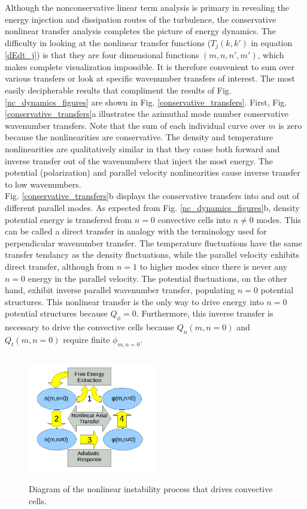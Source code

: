 \documentclass[12pt]{article}
\begin{document}
Although the nonconservative linear term analysis is primary in revealing the energy injection and dissipation routes of the turbulence, the conservative nonlinear transfer analysis completes
the picture of energy dynamics. The difficulty in looking at the nonlinear transfer functions ($T_{j}(k,k')$ in equation \ref{dEdt_j}) is that they are four dimensional functions $(m,n,n',m')$, 
which makes complete visualization impossible. It is therefore convenient to sum over various transfers or look at specific wavenumber transfers of interest. The most easily decipherable
results that compliment the results of Fig. \ref{nc_dynamics_figures} are shown in Fig. \ref{conservative_transfers}. First, Fig. \ref{conservative_transfers}a illustrates the azimuthal mode
number conservative wavenumber transfers. Note that the sum of each individual curve over $m$ is zero because the nonlinearities are conservative. The density and temperature nonlinearities
are qualitatively similar in that they cause both forward and inverse transfer out of the wavenumbers that inject the most energy. The potential (polarization) and parallel velocity 
nonlinearities cause inverse transfer to low wavenumbers. \\

Fig. \ref{conservative_transfers}b displays the conservative transfers into and out
of different parallel modes. As expected from Fig. \ref{nc_dynamics_figures}b, density potential energy is transfered from $n=0$ convective cells into $n \ne 0$ modes. This can be called a direct
transfer in analogy with the terminology used for perpendicular wavenumber transfer. The temperature fluctuations have the same transfer tendancy 
as the density fluctuations, while the parallel velocity exhibits direct transfer, although from $n=1$ to higher modes since there is never any $n=0$ energy in the parallel velocity.
The potential fluctuations, on the other hand, exhibit inverse parallel wavenumber transfer, populating $n=0$ potential structures. This nonlinear transfer is the only way to drive energy into
$n=0$ potential structures because $Q_\phi=0$. Furthermore, this inverse transfer is necessary to drive the convective cells because $Q_n(m,n=0)$ and $Q_t(m,n=0)$ require finite $\phi_{m,n=0}$. \\

\begin{figure}
\includegraphics[width=0.50\textwidth,height=55mm]{nl_instability_diagram}
\hfil
\caption{Diagram of the nonlinear instability process that drives convective cells.}
\label{nl_instability_diagram}
\end{figure}
\end{document}
